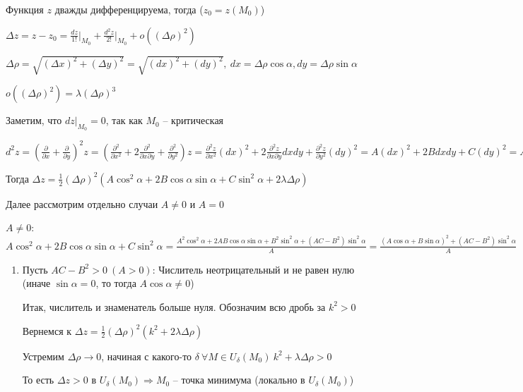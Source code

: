 \documentclass[12pt]{article}
\begin{document}
    \begin{MyProof}
        Функция $z$ дважды дифференцируема, тогда ($z_0 = z(M_0)$)

        $\Delta z = z - z_0 = \frac{dz}{1!} \Big|_{M_0} + \frac{d^2 z}{2!} \Big|_{M_0} + o((\Delta \rho)^2)$
        
        $\Delta \rho = \sqrt{(\Delta x)^2 + (\Delta y)^2} = \sqrt{(dx)^2 + (dy)^2}, \ dx = \Delta\rho \cos\alpha, dy = \Delta\rho \sin\alpha$

        $o((\Delta \rho)^2) = \lambda (\Delta \rho)^3$

        Заметим, что $dz \Big|_{M_0} = 0$, так как $M_0$ -- критическая

        $d^2 z = \left(\frac{\partial}{\partial x} + \frac{\partial}{\partial y}\right)^2 z = \left(\frac{\partial^2}{\partial x^2} + 2 \frac{\partial^2}{\partial x \partial y} + \frac{\partial^2}{\partial y^2}\right) z =
        \frac{\partial^2 z}{\partial x^2} (dx)^2 + 2 \frac{\partial^2 z}{\partial x \partial y} dxdy + \frac{\partial^2 z}{\partial y^2} (dy)^2 = A (dx)^2 + 2B dxdy + C(dy)^2 =
        A(\Delta \rho)^2 \cos^2\alpha + 2B (\Delta \rho)^2 \cos\alpha\sin\alpha + C(\Delta \rho)^2 \sin^2\alpha$

        Тогда $\Delta z = \frac{1}{2} (\Delta \rho)^2 (A\cos^2\alpha + 2B\cos\alpha\sin\alpha + C\sin^2\alpha + 2\lambda \Delta \rho)$

        Далее рассмотрим отдельно случаи $A \neq 0$ и $A = 0$

        $A \neq 0$: $A\cos^2\alpha + 2B\cos\alpha\sin\alpha + C\sin^2\alpha = \frac{A^2\cos^2\alpha + 2AB\cos\alpha\sin\alpha + B^2\sin^2\alpha + (AC - B^2)\sin^2\alpha}{A} =
        \frac{(A\cos\alpha + B\sin\alpha)^2 + (AC - B^2)\sin^2\alpha}{A}$

        \begin{enumerate}
            \item Пусть $AC - B^2 > 0 \ (A > 0)$: Числитель неотрицательный и не равен нулю (иначе $\sin\alpha = 0$, то тогда $A\cos\alpha \neq 0$)

            Итак, числитель и знаменатель больше нуля. Обозначим всю дробь за $k^2 > 0$

            Вернемся к $\Delta z = \frac{1}{2}(\Delta \rho)^2 (k^2 + 2\lambda\Delta\rho)$

            Устремим $\Delta \rho \rightarrow 0$, начиная с какого-то $\delta \ \forall M \in U_\delta(M_0) \ k^2 + \lambda\Delta\rho > 0$

            То есть $\Delta z > 0$ в $U_\delta(M_0) \Longrightarrow M_0$ -- точка минимума (локально в $U_\delta(M_0)$)


\end{enumerate}
\end{MyProof}
\end{document}
